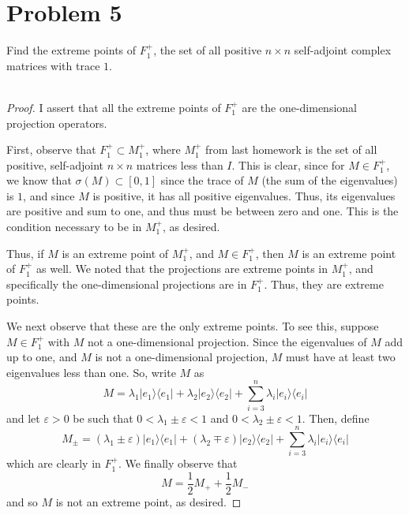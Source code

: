 \documentclass[fontsize=11pt]{scrartcl} %
\numberwithin{equation}{section} %
\numberwithin{figure}{section} %
\numberwithin{table}{section} %
\newcommand{\la}{\langle}
\newcommand{\ra}{\rangle}
\begin{document}
\section*{Problem 5}
Find the extreme points of $F_1^+$, the set of all positive $n\times n$
self-adjoint complex matrices with trace $1$.
\\
\\
\begin{proof}
    I assert that all the extreme points of $F_1^+$ are the one-dimensional
    projection operators.

    First, observe that $F_1^+\subset M_1^+$, where $M_1^+$ from last homework
    is the set of all positive, self-adjoint $n\times n$ matrices less than $I$.
    This is clear, since for $M\in F_1^+$, we know that $\sigma(M)\subset[0,1]$
    since the trace of $M$ (the sum of the eigenvalues) is $1$, and since $M$ is
    positive, it has all positive eigenvalues. Thus, its eigenvalues are
    positive and sum to one, and thus must be between zero and one. This is the
    condition necessary to be in $M_1^+$, as desired.

    Thus, if $M$ is an extreme point of $M_1^+$, and $M\in F_1^+$, then $M$ is
    an extreme point of $F_1^+$ as well. We noted that the projections are
    extreme points in $M_1^+$, and specifically the one-dimensional projections
    are in $F_1^+$. Thus, they are extreme points.

    We next observe that these are the only extreme points. To see this, suppose
    $M\in F_1^+$ with $M$ not a one-dimensional projection. Since the
    eigenvalues of $M$ add up to one, and $M$ is not a one-dimensional
    projection, $M$ must have at least two eigenvalues less than one. So, write
    $M$ as
    \[
        M = \lambda_1|e_1\ra\la e_1| + \lambda_2 |e_2\ra\la e_2| +
        \sum_{i=3}^n \lambda_i |e_i\ra\la e_i|
    \]
    and let $\varepsilon>0$ be such that $0 <\lambda_1\pm \varepsilon <1$ and
    $0<\lambda_2\pm\varepsilon < 1$. Then, define
    \[
        M_{\pm} = (\lambda_1\pm\varepsilon)|e_1\ra\la e_1| +
        (\lambda_2\mp\varepsilon) |e_2\ra\la e_2| + 
        \sum_{i=3}^n \lambda_i |e_i\ra\la e_i|
    \]
    which are clearly in $F_1^+$. We finally observe that
    \[
        M = \frac{1}{2}M_+ + \frac{1}{2}M_-
    \]
    and so $M$ is not an extreme point, as desired.
\end{proof}
\end{document}

